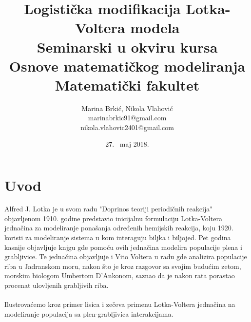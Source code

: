 \documentclass[a4paper]{article}
\begin{document}
\title{Logistička modifikacija Lotka-Voltera modela\\
	\small{Seminarski u okviru kursa\\Osnove matematičkog modeliranja\\Matematički fakultet}
}
\author{Marina Brkić, Nikola Vlahović\\marinabrkic91@gmail.com\\nikola.vlahovic2401@gmail.com}
\date{27. ~maj 2018.}
\maketitle
{}
\tableofcontents

\newpage

\section{Uvod}
\label{sec:uvod}

Alfred J. Lotka je u svom radu "Doprinos teoriji periodičnih reakcija" objavljenom 1910. godine predstavio
inicijalnu formulaciju Lotka-Voltera jednačina za modeliranje ponašanja određenih hemijskih reakcija, koju
1920. koristi za modeliranje sistema u kom interaguju biljka i biljojed. Pet godina kasnije objavljuje knjgu
gde pomoću ovih jednačina modelira populacije plena i grabljivice. Te jednačina objavljuje i Vito Voltera
u radu gde analizira populacije riba u Jadranskom moru, nakon što je kroz razgovor sa svojim budućim zetom,
morskim biologom Umbertom D'Ankonom, saznao da je nakon rata porastao procenat ulovljenih grabljivih riba.
\\\\
Ilustrovaćemo kroz primer lisica i zečeva primenu Lotka-Voltera jednačina na modeliranje
populacija sa plen-grabljivica interakcijama.
\end{document}
